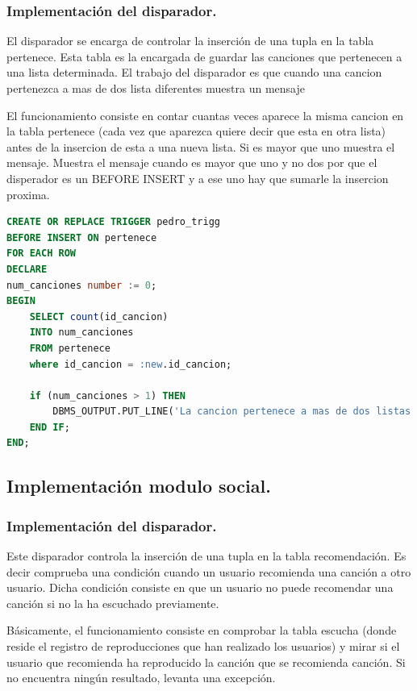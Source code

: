 \documentclass[12pt,a4paper]{article}
\begin{document}
\subsubsection{Implementación del disparador.}
	El disparador se encarga de controlar la inserción de una tupla en la tabla pertenece. Esta tabla es la encargada de guardar las canciones que pertenecen a una lista determinada. El trabajo del disparador es que cuando una cancion pertenezca a mas de dos lista diferentes muestra un mensaje 
	
	El funcionamiento consiste en contar cuantas veces aparece la misma cancion en la tabla pertenece (cada vez que aparezca quiere decir que esta en otra lista) antes de la insercion de esta a una nueva lista. Si es mayor que uno muestra el mensaje. Muestra el mensaje cuando es mayor que uno y no dos por que el disperador es un BEFORE INSERT y a ese uno hay que sumarle la insercion proxima.

\begin{lstlisting}[language=SQL]
CREATE OR REPLACE TRIGGER pedro_trigg
BEFORE INSERT ON pertenece
FOR EACH ROW
DECLARE
num_canciones number := 0;
BEGIN
    SELECT count(id_cancion) 
    INTO num_canciones 
    FROM pertenece  
    where id_cancion = :new.id_cancion;
    
	if (num_canciones > 1) THEN
		DBMS_OUTPUT.PUT_LINE('La cancion pertenece a mas de dos listas');
	END IF;    
END;
\end{lstlisting}

\subsection{Implementación modulo social.}
\subsubsection{Implementación del disparador.}
	Este disparador controla la inserción de una tupla en la tabla recomendación. Es decir comprueba una condición cuando un usuario recomienda una canción a otro usuario. Dicha condición consiste en que un usuario no puede recomendar una canción si no la ha escuchado previamente.
	
	Básicamente, el funcionamiento consiste en comprobar la tabla escucha (donde reside el registro de reproducciones que han realizado los usuarios) y mirar si el usuario que recomienda ha reproducido la canción que se recomienda canción. Si no encuentra ningún resultado, levanta una excepción.
\end{document}
